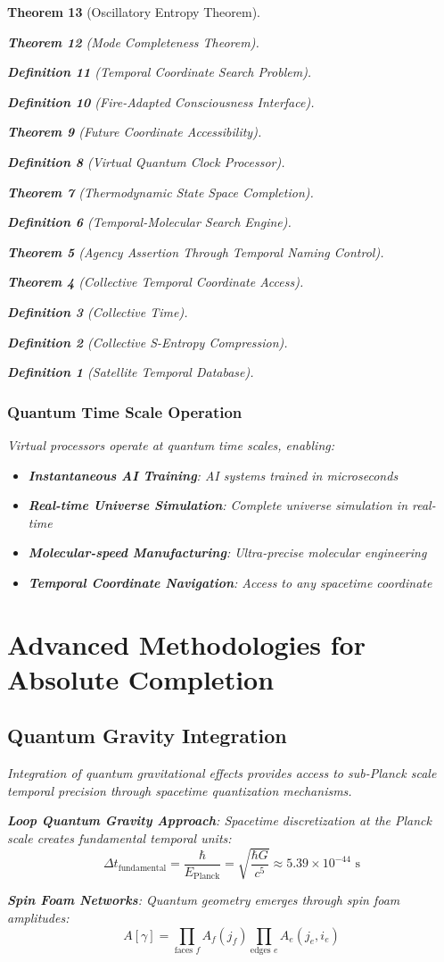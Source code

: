 \documentclass[12pt,a4paper]{article}
\newtheorem{theorem}{Theorem}[section]
\newtheorem{definition}[theorem]{Definition}
\begin{document}
\begin{theorem}[Oscillatory Entropy Theorem]
\begin{theorem}[Mode Completeness Theorem]
\begin{enumerate}
\begin{definition}[Temporal Coordinate Search Problem]
\begin{algorithm}
\begin{definition}[Fire-Adapted Consciousness Interface]
\begin{theorem}[Future Coordinate Accessibility]
\begin{definition}[Virtual Quantum Clock Processor]
\begin{itemize}
\begin{itemize}
\begin{theorem}[Thermodynamic State Space Completion]
\begin{definition}[Temporal-Molecular Search Engine]
\begin{theorem}[Agency Assertion Through Temporal Naming Control]
\begin{remark}
\begin{theorem}[Collective Temporal Coordinate Access]
\begin{definition}[Collective Time]
\begin{definition}[Collective S-Entropy Compression]
\begin{definition}[Satellite Temporal Database]
\begin{algorithm}
\begin{table}[h]
{\subsubsection{Quantum Time Scale Operation}

Virtual processors operate at quantum time scales, enabling:

\begin{itemize}
\item \textbf{Instantaneous AI Training}: AI systems trained in microseconds
\item \textbf{Real-time Universe Simulation}: Complete universe simulation in real-time
\item \textbf{Molecular-speed Manufacturing}: Ultra-precise molecular engineering
\item \textbf{Temporal Coordinate Navigation}: Access to any spacetime coordinate
\end{itemize}

\section{Advanced Methodologies for Absolute Completion}

\subsection{Quantum Gravity Integration}

Integration of quantum gravitational effects provides access to sub-Planck scale temporal precision through spacetime quantization mechanisms.

\textbf{Loop Quantum Gravity Approach}: Spacetime discretization at the Planck scale creates fundamental temporal units:
$$\Delta t_{\text{fundamental}} = \frac{\hbar}{E_{\text{Planck}}} = \sqrt{\frac{\hbar G}{c^5}} \approx 5.39 \times 10^{-44} \text{ s}$$

\textbf{Spin Foam Networks}: Quantum geometry emerges through spin foam amplitudes:
$$A[\gamma] = \prod_{\text{faces } f} A_f(j_f) \prod_{\text{edges } e} A_e(j_e,i_e)$$

}
\end{table}
\end{algorithm}
\end{definition}
\end{definition}
\end{definition}
\end{theorem}
\end{remark}
\end{theorem}
\end{definition}
\end{theorem}
\end{itemize}
\end{itemize}
\end{definition}
\end{theorem}
\end{definition}
\end{algorithm}
\end{definition}
\end{enumerate}
\end{theorem}
\end{theorem}
\end{document}

